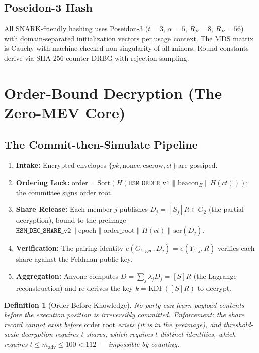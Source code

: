 \documentclass[11pt,a4paper]{article}
\newtheorem{definition}[theorem]{Definition}
\begin{document}
\subsection{Poseidon-3 Hash}

All SNARK-friendly hashing uses Poseidon-$3$ ($t = 3$, $\alpha = 5$,
 $R_F = 8$, $R_P = 56$) with domain-separated initialization vectors
per usage context. The MDS matrix is Cauchy with machine-checked
non-singularity of all minors. Round constants derive via SHA-256
counter DRBG with rejection sampling.

\section{Order-Bound Decryption (The Zero-MEV Core)}

\subsection{The Commit-then-Simulate Pipeline}

\begin{enumerate}
\item \textbf{Intake:} Encrypted envelopes
  $\{pk, \text{nonce}, \text{escrow}, ct\}$ are gossiped.
\item \textbf{Ordering Lock:}
  $\text{order} = \text{Sort}(H(\texttt{HSM\_ORDER\_v1} \| \text{beacon}_E \| H(ct)))$;
  the committee signs $\text{order\_root}$.
\item \textbf{Share Release:} Each member $j$ publishes
  $D_j = [S_j]R \in G_2$ (the partial decryption), bound to the preimage
  $\texttt{HSM\_DEC\_SHARE\_v2} \| \text{epoch} \| \text{order\_root} \|
  H(ct) \| \mathrm{ser}(D_j)$.
\item \textbf{Verification:} The pairing identity
  $e(G_{1,\mathrm{gen}}, D_j) = e(Y_{1,j}, R)$ verifies each share
  against the Feldman public key.
\item \textbf{Aggregation:} Anyone computes
  $D = \sum_j \lambda_j D_j = [S]R$ (the Lagrange reconstruction) and
  re-derives the key $k = \mathrm{KDF}([S]R)$ to decrypt.
\end{enumerate}

\begin{definition}[Order-Before-Knowledge]
No party can learn payload contents before the execution position is
irreversibly committed. Enforcement: the share record cannot exist
before $\text{order\_root}$ exists (it is in the preimage), and
threshold-scale decryption requires $t$ shares, which requires $t$ distinct identities, which requires $t \le m_{\text{adv}} \le 100 <
112$ --- impossible by counting.
\end{definition}
\end{document}
